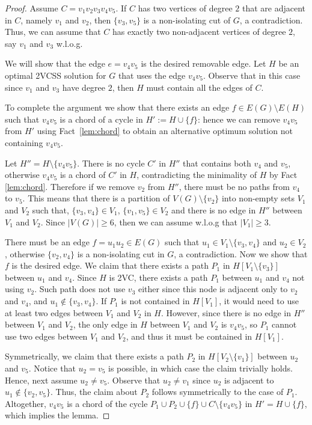 \documentclass{article}
\begin{document}
\begin{proof}
    Assume $C=v_1v_2v_3v_4v_5$.
    If $C$ has two vertices of degree $2$ that are adjacent in $C$, namely $v_1$ and $v_2$, then $\{v_3,v_5\}$ is a non-isolating cut of $G$, a contradiction. Thus, we can assume that $C$ has exactly two non-adjacent vertices of degree $2$, say $v_1$ and $v_3$ w.l.o.g. 
    
    We will show that the edge $e=v_4v_5$ is the desired removable edge. Let $H$ be an optimal 2VCSS solution for $G$ that uses the edge $v_4v_5$. Observe that in this case since $v_1$ and $v_3$ have degree $2$, then $H$ must contain all the edges of $C$.
    
    To complete the argument we show that there exists an edge $f\in E(G)\setminus E(H)$ such that $v_4v_5$ is a chord of a cycle in $H':=H\cup\{f\}$: hence we can remove $v_4v_5$ from $H'$     
    using Fact~\ref{lem:chord} 
    to obtain an alternative optimum solution not containing $v_4v_5$. 
    
    Let $H''=H\setminus\{v_4v_5\}$. There is no cycle $C'$ in $H''$ that contains both $v_4$ and $v_5$, otherwise $v_4v_5$ is a chord of $C'$ in $H$, contradicting the minimality of $H$ by Fact \ref{lem:chord}. Therefore if we remove $v_2$ from $H''$, there must be no paths from $v_4$ to $v_5$. This means that there is a partition of $V(G)\setminus\{v_2\}$ into non-empty sets $V_1$ and $V_2$ such that, $\{v_3,v_4\}\in V_1$, $\{v_1,v_5\}\in V_2$ and there is no edge in $H''$ between $V_1$ and $V_2$.  Since $|V(G)|\ge 6$, then we can assume w.l.o.g that $|V_1|\ge3$.
    
    There must be an edge $f=u_1u_2\in E(G)$ such that $u_1\in V_1\setminus\{v_3, v_4\}$ and $u_2 \in V_2$, otherwise  $\{v_2,v_4\}$ is a non-isolating cut in $G$, a contradiction. 
    Now we show that $f$ is the desired edge. We claim that there exists a path $P_1$ in $H[V_1\setminus \{v_3\}]$ between $u_1$ and $v_4$. Since $H$ is 2VC, there exists a path $P_1$ between $u_1$ and $v_4$ not using $v_2$. Such path does not use $v_3$ either since this node is adjacent only to $v_2$ and $v_4$, and $u_1\notin \{v_3,v_4\}$. If $P_1$ is not contained in $H[V_1]$, it would need to use at least two edges between $V_1$ and $V_2$ in $H$. However, since there is no edge in $H''$ between $V_1$ and $V_2$, the only edge in $H$ between $V_1$ and $V_2$ is $v_4v_5$, so $P_1$ cannot use two edges between $V_1$ and $V_2$, and thus it must be contained in $H[V_1]$.
    
    Symmetrically, we claim that there exists a path $P_2$ in $H[V_2\setminus \{v_1\}]$ between $u_2$ and $v_5$. Notice that $u_2=v_5$ is possible, in which case the claim trivially holds. Hence, next assume $u_2\neq v_5$. Observe that $u_2\neq v_1$ since $u_2$ is adjacent to $u_1\notin \{v_2,v_5\}$. Thus, the claim about $P_2$ follows symmetrically to the case of $P_1$. Altogether, $v_4v_5$ is a chord of the cycle $P_1\cup P_2 \cup \{f\} \cup C \setminus\{v_4v_5\}$ in $H'=H\cup\{f\}$, which implies the lemma.
\end{proof}
\end{document}
